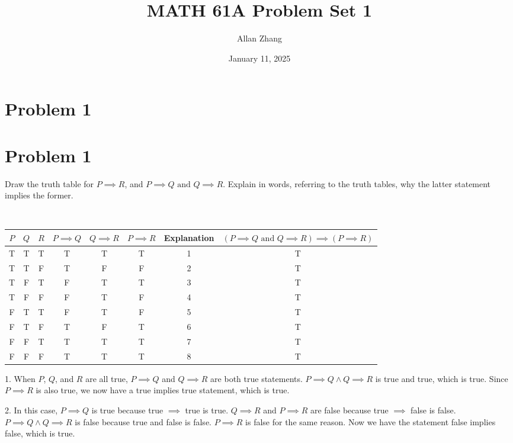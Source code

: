 \documentclass[hidelinks]{article}
\title{\textbf{MATH 61A Problem Set 1}}
\author{Allan Zhang}
\date{January 11, 2025}
\begin{document}
\hypersetup{bookmarksnumbered=true,}
\pagecolor{white}
\color{black}
\maketitle
\section*{Problem 1}
\section*{Problem 1}
Draw the truth table for \(P \implies R\), and \(P \implies Q \text{ and } Q \implies R\). Explain in words, referring to the truth tables, why the latter statement implies the former.

\begin{center}
\\
\vspace{0.2cm}
\begin{tabular}{|c|c|c|c|c|c|c|c|}
\hline
\(P\) & \(Q\) & \(R\) & \(P \implies Q\) & \(Q \implies R\) & \(P \implies R\) & Explanation & \((P \implies Q \text{ and } Q \implies R) \implies (P \implies R)\) \\
\hline
T & T & T & T & T & T & 1 & T\\
T & T & F & T & F & F & 2 & T\\
T & F & T & F & T & T & 3 & T\\
T & F & F & F & T & F & 4 & T\\
F & T & T & F & T & F & 5 & T\\
F & T & F & T & F & T & 6 & T\\
F & F & T & T & T & T & 7 & T\\
F & F & F & T & T & T & 8 & T\\
\hline
\end{tabular}
\end{center}

1. When \(P\), \(Q\), and \(R\) are all true, \(P \implies Q\) and \(Q \implies R\) are both true statements. \(P \implies Q \wedge Q \implies R\) is true and true, which is true. Since \(P \implies R\) is also true, we now have a true implies true statement, which is true.
\vspace{0.2cm}

2. In this case, \(P \implies Q\) is true because true \(\implies\) true is true. \(Q \implies R\) and \(P \implies R\) are false because true \(\implies\) false is false. \(P \implies Q \wedge Q \implies R\) is false because true and false is false. \(P \implies R\) is false for the same reason. Now we have the statement false implies false, which is true. 
\vspace{0.2cm}
\end{document}
